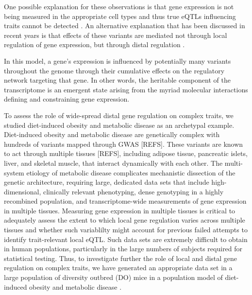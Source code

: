 \documentclass[
]{article}
\begin{document}
One possible explanation for these observations is that gene expression
is not being measured in the appropriate cell types and thus true eQTLs
influencing traits cannot be detected \cite{pmid32912663}. An
alternative explanation that has been discussed in recent years is that
effects of these variants are mediated not through local regulation of
gene expression, but through distal regulation
\cite{pmid37857933, pmid32424349, 
pmid32831138, pmid30950127}.

In this model, a gene's expression is influenced by potentially many
variants throughout the genome through their cumulative effects on the
regulatory network targeting that gene. In other words, the heritable
component of the transcriptome is an emergent state arising from the
myriad molecular interactions defining and constraining gene expression.

To assess the role of wide-spread distal gene regulation on complex
traits, we studied diet-induced obesity and metabolic disease as an
archetypal example. Diet-induced obesity and metabolic disease are
genetically complex with hundreds of variants mapped through GWAS
{[}REFS{]}. These variants are known to act through multiple tissues
{[}REFS{]}, including adipose tissue, pancreatic islets, liver, and
skeletal muscle, that interact dynamically with each other. The
multi-system etiology of metabolic disease complicates mechanistic
dissection of the genetic architecture, requiring large, dedicated data
sets that include high-dimensional, clinically relevant phenotyping,
dense genotyping in a highly recombined population, and
transcriptome-wide measurements of gene expression in multiple tissues.
Measuring gene expression in multiple tissues is critical to adequately
assess the extent to which local gene regulation varies across multiple
tissues and whether such variablilty might account for previous failed
attempts to identify trait-relevant local eQTL. Such data sets are
extremely difficult to obtain in human populations, particularly in the
large numbers of subjects required for statistical testing. Thus, to
investigate further the role of local and distal gene regulation on
complex traits, we have generated an appropriate data set in a large
population of diversity outbred (DO) mice \cite{pmid22892839} in a
population model of diet-induced obesity and metabolic disease
\cite{pmid29567659}.
\end{document}
